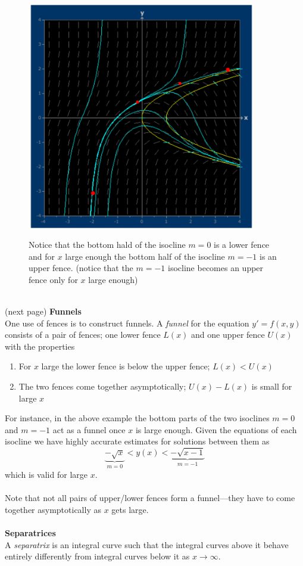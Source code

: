 \documentclass{report}
\begin{document}
\begin{figure}[h]
\begin{center}
\includegraphics[width=10cm]{4}\\
\end{center}
Notice that the bottom hald of the isocline $m=0$ is a lower fence and for $x$ large enough the bottom 
half of the isocline $m=-1$ is an upper fence. (notice that the $m=-1$ isocline becomes an upper
fence only for $x$ large enough)
\end{figure}\\
(next page)
\newpage
\noindent\textbf{Funnels}\\
One use of fences is to construct funnels. A \textit{funnel} for the equation $y'=f(x,y)$ consists of a pair of 
fences; one lower fence $L(x)$ and one upper fence $U(x)$ with the properties
\begin{enumerate}
\item For $x$ large the lower fence is below the upper fence; $L(x)<U(x)$
\item The two fences come together asymptotically; $U(x)-L(x)$ is small for large $x$
\end{enumerate}
For instance, in the above example the bottom parts of the two isoclines $m=0$ and $m=-1$ act as a funnel
once $x$ is large enough. Given the equations of each isocline we have highly accurate estimates for solutions
between them as
\begin{equation*}
\underbrace{-\sqrt{x}}_{m=0}<y(x)<\underbrace{-\sqrt{x-1}}_{m=-1}
\end{equation*}
which is valid for large $x$.\\
\vspace{1mm}\\
Note that not all pairs of upper/lower fences form a funnel---they have to come together asymptotically as $x$ 
gets large.\\
\vspace{1mm}\\
\textbf{Separatrices}\\
A \textit{separatrix} is an integral curve such that the integral curves above it behave entirely differently from
integral curves below it as $x\to\infty$.
\newpage
\end{document}
